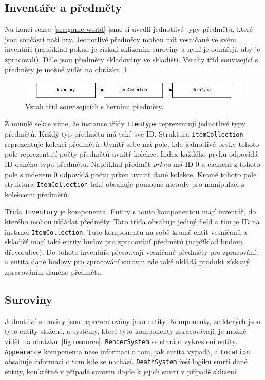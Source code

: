 \subsection{Inventáře a předměty}
Na konci sekce~\ref{sec:game-world} jsme si uvedli jednotlivé typy předmětů, které jsou součástí naší hry. Jednotlivé předměty mohou mít vesničané ve svém inventáři (například pokud je získali sklizením suroviny a nyní je odnášejí, aby je zpracovali). Dále jsou předměty skladovány ve skladišti. Vztahy tříd související s předměty je možné vidět na obrázku~\ref{fig:items}.

\begin{figure}[!htb]
  \centering
  \includegraphics[width=0.8\linewidth]{img/items.pdf}
  \caption{Vztah tříd souvisejících s herními předměty.}
  \label{fig:items}
\end{figure}

Z minulé sekce víme, že instance třídy \texttt{ItemType} reprezentují jednotlivé typy předmětů. Každý typ předmětu má také své ID. Struktura \texttt{ItemCollection} reprezentuje kolekci předmětů. Uvnitř sebe má pole, kde jednotlivé prvky tohoto pole reprezentují počty předmětů uvnitř kolekce. Index každého prvku odpovídá ID daného typu předmětu. Například předmět \textit{prkno} má ID 0 a element z tohoto pole s indexem 0 odpovídá počtu prken uvnitř dané kolekce. Kromě tohoto pole struktura \texttt{ItemCollection} také obsahuje pomocné metody pro manipulaci s kolekcemi předmětů.

Třída \texttt{Inventory} je komponenta. Entity s touto komponentou mají inventář, do kterého mohou ukládat předměty. Tato třída obsahuje jediný field a tím je ID na instanci \texttt{ItemCollection}. Tuto komponentu na sobě kromě entit vesničanů a skladišť mají také entity budov pro zpracování předmětů (například budova dřevorubce). Do tohoto inventáře přesouvají vesničané předměty pro zpracování, a entita dané budovy pro zpracování surovin zde také ukládá produkt získaný zpracováním daného předmětu.

\subsection{Suroviny}
\label{sec:res-impl}
Jednotlivé suroviny jsou reprezentovány jako entity. Komponenty, ze kterých jsou tyto entity složené, a systémy, které tyto komponenty zpracovávají, je možné vidět na obrázku~\ref{fig:resource}. \texttt{RenderSystem} se stará o vykreslení entity. \texttt{Appearance} komponenta nese informaci o tom, jak entita vypadá, a \texttt{Location} obsahuje informaci o tom kde se nachází. \texttt{DeathSystem} řeší logiku smrti dané entity, konkrétně v případě surovin dojde k jejich smrti v případě sklizení.

